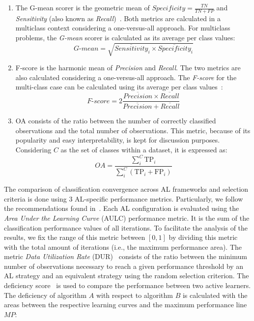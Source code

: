 \documentclass[parskip=full]{scrartcl}
\begin{document}
\begin{enumerate}
    \item The G-mean scorer is the geometric mean of $Specificity = \frac{TN}{TN
        + FP}$ and \textit{Sensitivity} (also known as
        \textit{Recall})~\cite{Kubat1997}. Both metrics are calculated in a
        multiclass context considering a one-versus-all approach. For multiclass
        problems, the \textit{G-mean} scorer is calculated as its average per
        class values: 
        \begin{equation}\label{eq:gmean}
            \textit{G-mean} = \sqrt{\overline{Sensitivity}_i \times
            \overline{Specificity}_i}
        \end{equation}
    
    \item F-score is the harmonic mean of \textit{Precision} and
        \textit{Recall}. The two metrics are also calculated considering a
        one-versus-all approach. The \textit{F-score} for the multi-class case
        can be calculated using its average per class values~\cite{He2009}:
        \begin{equation}\label{eq:fscore}
            \textit{F-score}=2\frac{\overline{Precision} \times
            \overline{Recall}}{\overline{Precision} + \overline{Recall}}
        \end{equation}

    \item OA consists of the ratio between the number of correctly classified
        observations and the total number of observations. This metric, because of its
        popularity and easy interpretability, is kept for discussion purposes.
        Considering $C$ as the set of classes within a dataset, it is expressed as: 
        \begin{equation}\label{eq:oa}
            \textit{OA} =
            \frac{\sum_{i}^{C}{\text{TP}_{i}}}{\sum_{i}^{C}{(\text{TP}_{i} +
            \text{FP}_{i})}}
        \end{equation}

\end{enumerate}

The comparison of classification convergence across AL frameworks and selection
criteria is done using 3 AL-specific performance metrics. Particularly, we
follow the recommendations found in~\cite{Kottke2017}. Each AL configuration is
evaluated using the \textit{Area Under the Learning Curve} (AULC) performance
metric. It is the sum of the classification performance values of all
iterations. To facilitate the analysis of the results, we fix the range of this
metric between $[0,1]$ by dividing this metric with the total amount of
iterations (i.e., the maximum performance area). The metric \textit{Data
Utilization Rate} (DUR)~\cite{Reitmaier2013} consists of the ratio between the
minimum number of observations necessary to reach a given performance threshold
by an AL strategy and an equivalent strategy using the random selection
criterion. The deficiency score~\cite{Yanik2015} is used to compare the
performance between two active learners. The deficiency of algorithm $A$ with
respect to algorithm $B$ is calculated with the areas between the respective
learning curves and the maximum performance line $MP$:
\end{document}
